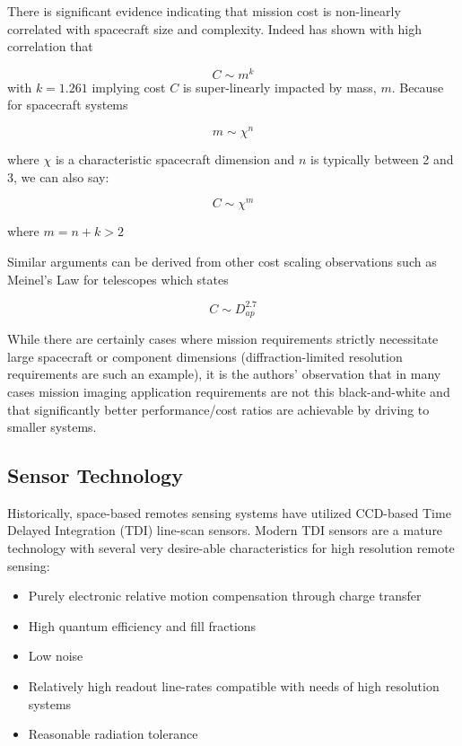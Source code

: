 \documentclass[10pt,journal]{IEEEtran}  %
\begin{document}
There is significant evidence indicating that mission cost is non-linearly correlated with spacecraft size and complexity.  Indeed \cite{bearden} has shown with high correlation that 

$$C \sim m^k$$
with $k=1.261$ implying cost $C$ is super-linearly impacted by mass, $m$.  Because for spacecraft systems

$$m \sim \chi^n$$

where $\chi$ is a characteristic spacecraft dimension and $n$ is typically between 2 and 3, we can also say:

\begin{equation}
C \sim \chi^m
\end{equation}

where $m = n + k > 2$

Similar arguments can be derived from other cost scaling observations such as Meinel's Law for telescopes which states

$$C \sim D_{ap}^{2.7}$$

While there are certainly cases where mission requirements strictly necessitate large spacecraft or component dimensions (diffraction-limited resolution requirements are such an example), it is the authors' observation that in many cases mission imaging application requirements are not this black-and-white and that significantly better performance/cost ratios are achievable by driving to smaller systems.

\subsection{Sensor Technology}
\label{sec:sensor_trends}

Historically, space-based remotes sensing systems have utilized CCD-based Time Delayed Integration (TDI) line-scan sensors.  Modern TDI sensors are a mature technology with several very desire-able characteristics for high resolution remote sensing:

\begin{itemize}
    \item Purely electronic relative motion compensation through charge transfer
    \item High quantum efficiency and fill fractions
    \item Low noise
    \item Relatively high readout line-rates compatible with needs of high resolution systems
    \item Reasonable radiation tolerance
\end{itemize}
\end{document}
